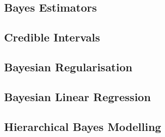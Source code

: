 \documentclass[11pt]{report} %
\begin{document}
\subsection{Bayes Estimators}

\subsection{Credible Intervals}

\subsection{Bayesian Regularisation}

\subsection{Bayesian Linear Regression \cite{Rasmussen2006}}

\subsection{Hierarchical Bayes Modelling \cite{Rasmussen2006}}
\end{document}
